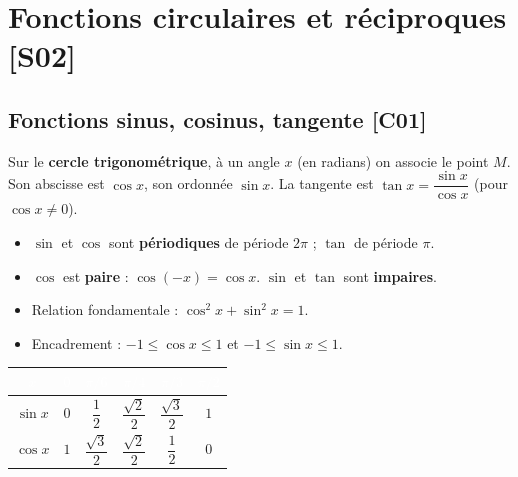 \documentclass[a4paper,11pt]{article}
\begin{document}
\newpage
\section{Fonctions circulaires et réciproques \hfill {\normalsize\color{uimmred}[S02]}}

\subsection{Fonctions sinus, cosinus, tangente \hfill {\normalsize\color{uimmred}[C01]}}

\begin{definition}
Sur le \textbf{cercle trigonométrique}, à un angle $x$ (en radians) on associe le point $M$. Son abscisse est $\cos x$, son ordonnée $\sin x$. La tangente est $\tan x = \dfrac{\sin x}{\cos x}$ (pour $\cos x \neq 0$).
\end{definition}

\begin{theoreme}[-- Propriétés]
\begin{itemize}
  \item $\sin$ et $\cos$ sont \textbf{périodiques} de période $2\pi$ ; $\tan$ de période $\pi$.
  \item $\cos$ est \textbf{paire} : $\cos(-x) = \cos x$. $\sin$ et $\tan$ sont \textbf{impaires}.
  \item Relation fondamentale : $\cos^2 x + \sin^2 x = 1$.
  \item Encadrement : $-1 \leq \cos x \leq 1$ et $-1 \leq \sin x \leq 1$.
\end{itemize}
\end{theoreme}

\begin{center}
\renewcommand{\arraystretch}{1.5}
\begin{tabular}{|c|c|c|c|c|c|}
\hline
\rowcolor{uimmblue}
\textcolor{white}{$x$} & \textcolor{white}{$0$} & \textcolor{white}{$\pi/6$} & \textcolor{white}{$\pi/4$} & \textcolor{white}{$\pi/3$} & \textcolor{white}{$\pi/2$} \\
\hline
$\sin x$ & $0$ & $\dfrac{1}{2}$ & $\dfrac{\sqrt{2}}{2}$ & $\dfrac{\sqrt{3}}{2}$ & $1$ \\
\hline
$\cos x$ & $1$ & $\dfrac{\sqrt{3}}{2}$ & $\dfrac{\sqrt{2}}{2}$ & $\dfrac{1}{2}$ & $0$ \\
\hline
\end{tabular}
\end{center}
\end{document}
